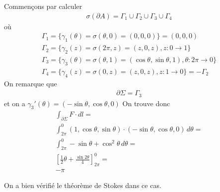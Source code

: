 \begin{myExample}
\begin{enumerate}
			Commençons par calculer
			\begin{eqnarray*}
				\sigma(\partial A)=\Gamma_1\cup\Gamma_2\cup\Gamma_3\cup\Gamma_4
			\end{eqnarray*}
			où
			\begin{eqnarray*}
				\Gamma_1=\{\gamma_1(\theta)=\sigma(\theta,0)=(0,0,0)\}={(0,0,0)}
				\\
				\Gamma_2=\{\gamma_2(z)=\sigma(2\pi,z)=(z,0,z),z:0\rightarrow 1\}
				\\
				\Gamma_3=\{\gamma_3(\theta)=\sigma(\theta,1)=(\cos\theta,\sin\theta,1),\theta:2\pi\rightarrow 0\}
				\\
				\Gamma_4=\{\gamma_4(z)=\sigma(0,z)=(z,0,z),z:1\rightarrow 0\}=-\Gamma_2
			\end{eqnarray*}
			On remarque que
			\begin{eqnarray*}
				\partial\Sigma=\Gamma_3
			\end{eqnarray*}
			et on a $\gamma_3'(\theta)=(-\sin\theta,\cos\theta,0)$
			On trouve donc
			\begin{eqnarray*}
				\int_{\partial\Sigma}F\cdot dl=
				\\
				\int_{2\pi}^{0}(1,\cos\theta,\sin\theta)\cdot(-\sin\theta,\cos\theta,0)\,d\theta=
				\\
				\int_{2\pi}^{0}-\sin\theta+\cos^2\theta\,d\theta=
				\\
				\left[\frac{1}{2}\theta+\frac{\sin2\theta}{4}\right]_{2\pi}^0=
				\\
				-\pi
			\end{eqnarray*}
	\end{enumerate}
	On a bien vérifié le théorème de Stokes dans ce cas.
\end{myExample}


